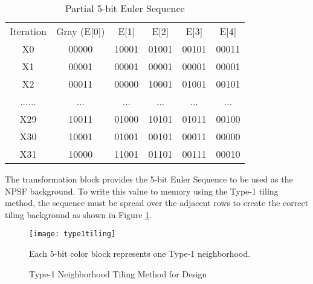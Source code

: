 \begin{table}[H]
  \caption{Partial 5-bit Euler Sequence}
  \centering
  \begin{tabular}{c c c c c c}
  \hline\hline
  Iteration    & Gray (E[0]) & E[1]  & E[2]  & E[3]  & E[4]  \\
  X0  & 00000 & 10001 & 01001 & 00101 & 00011 \\
  X1  & 00001 & 00001 & 00001 & 00001 & 00001 \\
  X2  & 00011 & 00000 & 10001 & 01001 & 00101 \\
  ......             & ...   & ...   & ...   & ...   & ...   \\
  X29 & 10011 & 01000 & 10101 & 01011 & 00100 \\
  X30 & 10001 & 01001 & 00101 & 00011 & 00000 \\
  X31 & 10000 & 11001 & 01101 & 00111 & 00010 \\ [0.5ex]
  \end{tabular}
  \label{tab:euler}
\end{table}

The transformation block provides the 5-bit Euler Sequence to be used as the NPSF background.  To write this value to memory using the Type-1 tiling method, the sequence must be spread over the adjacent rows to create the correct tiling background as shown in Figure \ref{fig:tiling}.  

\begin{figure}[H]
  \centering
  \texttt{[image: type1tiling]}
  \caption[Type-1 Neighborhood Tiling Method for Design]{Type-1 Neighborhood Tiling Method for Design}  
   Each 5-bit color block represents one Type-1 neighborhood.
  \label{fig:tiling}
\end{figure}


